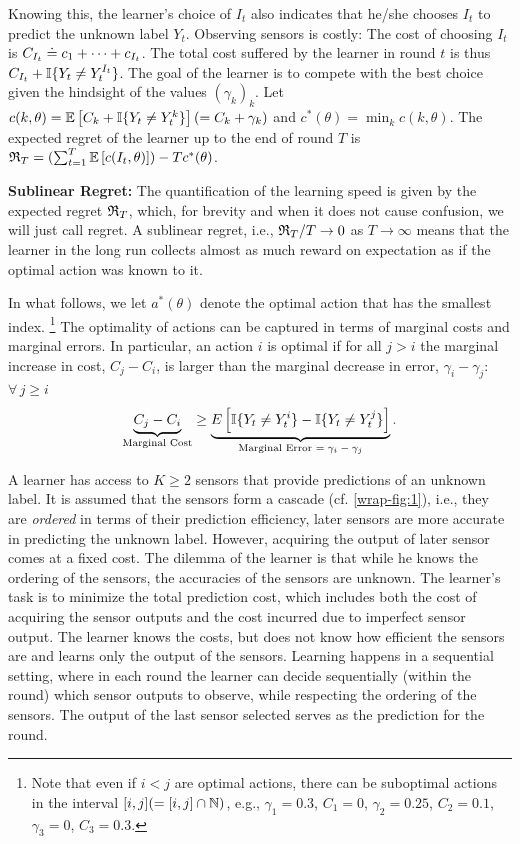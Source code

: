 Knowing this, the learner's choice of $I_t$ also indicates that he/she chooses $I_t$ to predict the unknown label $Y_t$.
Observing sensors is costly: The cost of choosing $I_t$ is $C_{I_t} \doteq c_1 + \dots + c_{I_t}$.
The total cost suffered by the learner in round $t$ is thus $C_{I_t} + \mathbb{I}\{Y_t \ne Y_t^{I_t}\}$.
The goal of the learner is to compete with the best choice given the hindsight of the values $(\gamma_k)_k$.
Let $c(k,\theta) = \mathbb{E}\left[ C_{k} +\mathbb{I}\{Y_t \ne Y_t^{k} \}\right]  (= C_k + \gamma_k)$ and $c^*(\theta) = \min_k c(k,\theta)$. The expected regret of the learner up to the end of round $T$ is 
$\mathfrak{R}_T =( \sum_{t=1}^T \mathbb{E}\left[ c(I_t,\theta) \right]) - T c^*(\theta)$.

\noindent
{\bf Sublinear Regret:} The quantification of the learning speed is given by the expected regret 
$\mathfrak{R}_T$, which, for brevity and when it does not cause confusion, 
we will just call regret. A sublinear  regret, i.e., $\mathfrak{R}_T/T \to 0$ as $T\to \infty$ means that the learner in the long run collects almost as much reward on expectation as if the optimal action was known to it.


In what follows, we let $a^*(\theta)$ denote the optimal action that has the smallest index.%
\footnote{Note that even if $i<j$ are optimal actions, there can be suboptimal actions in the interval $[i,j] (=[i,j]\cap \mathbb{N})$,
e.g., $\gamma_1=0.3$, $C_1=0$, $\gamma_2=0.25$, $C_2=0.1$, $\gamma_3=0$, $C_3=0.3$.} 
The optimality of actions can be captured in terms of marginal costs and marginal errors.
In particular, an action $i$ is optimal if for all $j > i$ the marginal increase in cost, $C_j - C_i$, 
is larger than the marginal decrease in error, $\gamma_i - \gamma_j$: $ \forall \, j \geq i\,$
%
\begin{equation} \label{eqn:interp_opt}
\vspace{-5pt}
\underbrace{C_j - C_i}_{\text{Marginal Cost}} \geq \underbrace{ E \left [ \ind{Y_t \ne Y_t^i} - \ind{Y_t \ne Y_t^j} \right ]}_{\text{Marginal Error $= \gamma_i-\gamma_j$}}.
\end{equation}


A learner has access to $K\geq 2$ sensors that provide predictions
of an unknown label. 
 It is assumed that the sensors form a cascade (cf. \cref{wrap-fig:1}),
i.e., they are  \emph{ordered} in terms of their prediction efficiency,
later sensors are more accurate in predicting the unknown label.
However, acquiring the output of later sensor comes at a fixed cost.
The dilemma of the learner is that while he knows the ordering of the sensors,
the accuracies of the sensors are unknown.
The learner's task is to minimize the total prediction cost, which includes
both the cost of acquiring the sensor outputs and the cost incurred due to imperfect
sensor output.
The learner knows the costs, but does not know how efficient the sensors are
and learns only the output of the sensors.
Learning happens in a sequential setting, where in each round the learner can decide
sequentially (within the round) which sensor outputs to observe,
while respecting the ordering of the sensors.
The output of the last sensor selected serves as the prediction for the round.

